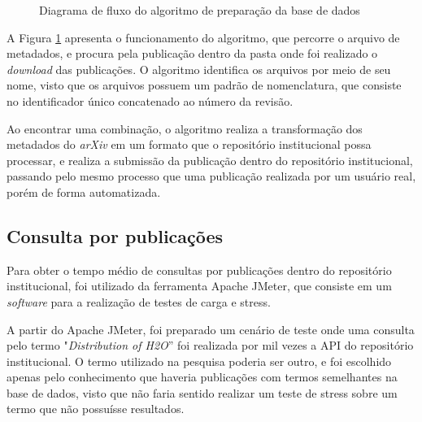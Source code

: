 \begin{figure}[H]
    \caption{Diagrama de fluxo do algoritmo de preparação da base de dados}
    \centering
    \label{fig:pseudo-algoritmo}
\end{figure}

A Figura \ref{fig:pseudo-algoritmo} apresenta o funcionamento do algoritmo, que percorre o arquivo
de metadados, e procura pela publicação dentro da pasta onde foi realizado o \emph{download} das publicações.
O algoritmo identifica os arquivos por meio de seu nome, visto que os arquivos possuem um padrão de nomenclatura,
que consiste no identificador único concatenado ao número da revisão.

Ao encontrar uma combinação, o algoritmo realiza a transformação dos metadados do
\emph{arXiv} em um formato que o repositório institucional possa processar, e realiza
a submissão da publicação dentro do repositório institucional, passando pelo mesmo
processo que uma publicação realizada por um usuário real, porém de forma automatizada.

\subsection{Consulta por publicações}

Para obter o tempo médio de consultas por publicações dentro do repositório
institucional, foi utilizado da ferramenta Apache JMeter, que consiste em um
\emph{software} para a realização de testes de carga e stress.

A partir do Apache JMeter, foi preparado um cenário de teste onde uma consulta
pelo termo "\emph{Distribution of H2O}'' foi realizada por mil vezes a API do
repositório institucional. O termo utilizado na pesquisa poderia ser outro, e
foi escolhido apenas pelo conhecimento que haveria publicações com termos semelhantes
na base de dados, visto que não faria sentido realizar um teste de stress sobre um termo
que não possuísse resultados.

